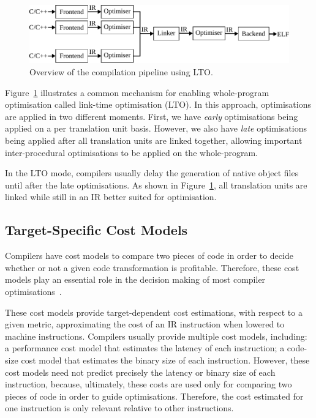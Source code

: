 \begin{figure}[h]
  \centering
  \includegraphics[scale=0.85]{src/background/figs/full-pipeline-LTO.pdf}
  \caption{Overview of the compilation pipeline using LTO.}
  \label{fig:full-LTO-pipeline}
\end{figure}

Figure~\ref{fig:full-LTO-pipeline} illustrates a common mechanism for enabling whole-program optimisation called link-time optimisation (LTO).
In this approach, optimisations are applied in two different moments.
First, we have \textit{early} optimisations being applied on a per translation unit basis.
However, we also have \textit{late} optimisations being applied after all translation units are linked together, allowing important inter-procedural optimisations to be applied on the whole-program.

In the LTO mode, compilers usually delay the generation of native object files until after the late optimisations.
As shown in Figure~\ref{fig:full-LTO-pipeline}, all translation units are linked while still in an IR better suited for optimisation.

\subsection{Target-Specific Cost Models} \label{sec:background:costmodel}

Compilers have cost models to compare two pieces of code in order to decide whether or not a given code transformation is profitable.
Therefore, these cost models play an essential role in the decision making of most compiler optimisations~\cite{porpodas18b,pohl18}.

These cost models provide target-dependent cost estimations, with respect to a given metric, 
approximating the cost of an IR instruction when lowered to machine instructions.
Compilers usually provide multiple cost models, including: a performance cost model that estimates the latency of each instruction; a code-size cost model that estimates the binary size of each instruction.
However, these cost models need not predict precisely the latency or binary size of each instruction, because, ultimately, these costs are used only for comparing two pieces of code in order to guide optimisations.
Therefore, the cost estimated for one instruction is only relevant relative to other instructions.

